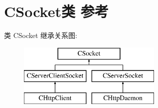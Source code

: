 \hypertarget{class_c_socket}{}\section{C\+Socket类 参考}
\label{class_c_socket}
类 C\+Socket 继承关系图\+:\begin{figure}[H]
\begin{center}
\leavevmode
\includegraphics[height=3.000000cm]{class_c_socket}
\end{center}
\end{figure}
